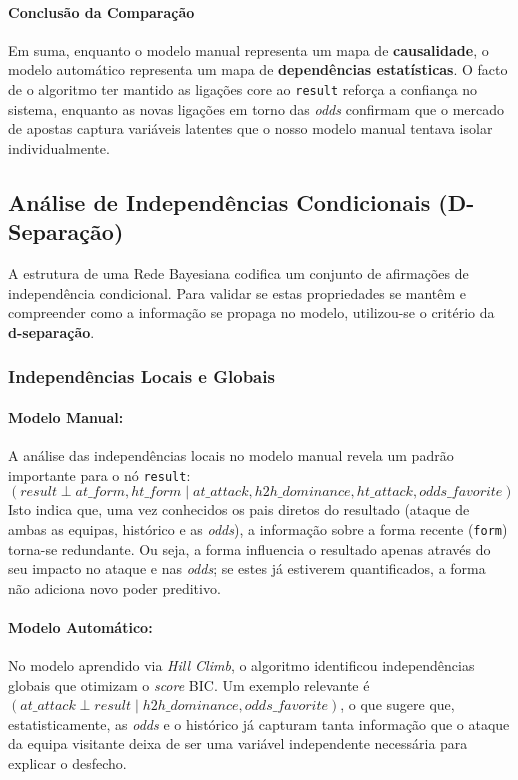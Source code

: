 \documentclass[10pt]{article}
\begin{document}
\paragraph{Conclusão da Comparação}
Em suma, enquanto o modelo manual representa um mapa de \textbf{causalidade}, o modelo automático representa um mapa de \textbf{dependências estatísticas}. O facto de o algoritmo ter mantido as ligações core ao \texttt{result} reforça a confiança no sistema, enquanto as novas ligações em torno das \textit{odds} confirmam que o mercado de apostas captura variáveis latentes que o nosso modelo manual tentava isolar individualmente.

\subsection{Análise de Independências Condicionais (D-Separação)}

A estrutura de uma Rede Bayesiana codifica um conjunto de afirmações de independência condicional. Para validar se estas propriedades se mantêm e compreender como a informação se propaga no modelo, utilizou-se o critério da \textbf{d-separação}.

\subsubsection{Independências Locais e Globais}

\paragraph{Modelo Manual:} 
A análise das independências locais no modelo manual revela um padrão importante para o nó \texttt{result}:
\begin{equation*}
    (result \perp at\_form, ht\_form \mid at\_attack, h2h\_dominance, ht\_attack, odds\_favorite)
\end{equation*}
Isto indica que, uma vez conhecidos os pais diretos do resultado (ataque de ambas as equipas, histórico e as \textit{odds}), a informação sobre a forma recente (\texttt{form}) torna-se redundante. Ou seja, a forma influencia o resultado apenas através do seu impacto no ataque e nas \textit{odds}; se estes já estiverem quantificados, a forma não adiciona novo poder preditivo.

\paragraph{Modelo Automático:}
No modelo aprendido via \textit{Hill Climb}, o algoritmo identificou independências globais que otimizam o \textit{score} BIC. Um exemplo relevante é $(at\_attack \perp result \mid h2h\_dominance, odds\_favorite)$, o que sugere que, estatisticamente, as \textit{odds} e o histórico já capturam tanta informação que o ataque da equipa visitante deixa de ser uma variável independente necessária para explicar o desfecho.
\end{document}
